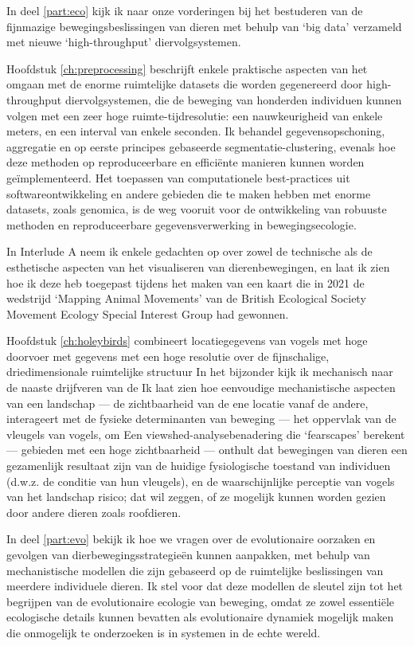 In deel \ref{part:eco} kijk ik naar onze vorderingen bij het bestuderen van de fijnmazige bewegingsbeslissingen van dieren met behulp van `big data' verzameld met nieuwe `high-throughput' diervolgsystemen.

Hoofdstuk \ref{ch:preprocessing} beschrijft enkele praktische aspecten van het omgaan met de enorme ruimtelijke datasets die worden gegenereerd door high-throughput diervolgsystemen, die de beweging van honderden individuen kunnen volgen met een zeer hoge ruimte-tijdresolutie: een nauwkeurigheid van enkele meters, en een interval van enkele seconden. Ik behandel gegevensopschoning, aggregatie en op eerste principes gebaseerde segmentatie-clustering, evenals hoe deze methoden op reproduceerbare en effici{\"e}nte manieren kunnen worden ge{\"i}mplementeerd. Het toepassen van computationele best-practices uit softwareontwikkeling en andere gebieden die te maken hebben met enorme datasets, zoals genomica, is de weg vooruit voor de ontwikkeling van robuuste methoden en reproduceerbare gegevensverwerking in bewegingsecologie.

In Interlude A neem ik enkele gedachten op over zowel de technische als de esthetische aspecten van het visualiseren van dierenbewegingen, en laat ik zien hoe ik deze heb toegepast tijdens het maken van een kaart die in 2021 de wedstrijd `Mapping Animal Movements' van de British Ecological Society Movement Ecology Special Interest Group had gewonnen.

Hoofdstuk \ref{ch:holeybirds} combineert locatiegegevens van vogels met hoge doorvoer met gegevens met een hoge resolutie over de fijnschalige, driedimensionale ruimtelijke structuur
In het bijzonder kijk ik mechanisch naar de naaste drijfveren van de
Ik laat zien hoe eenvoudige mechanistische aspecten van een landschap --- de zichtbaarheid van de ene locatie vanaf de andere, interageert met de fysieke determinanten van beweging --- het oppervlak van de vleugels van vogels, om
Een viewshed-analysebenadering die `fearscapes' berekent --- gebieden met een hoge zichtbaarheid --- onthult dat bewegingen van dieren een gezamenlijk resultaat zijn van de huidige fysiologische toestand van individuen (d.w.z. de conditie van hun vleugels), en de waarschijnlijke perceptie van vogels van het landschap risico; dat wil zeggen, of ze mogelijk kunnen worden gezien door andere dieren zoals roofdieren.

In deel \ref{part:evo} bekijk ik hoe we vragen over de evolutionaire oorzaken en gevolgen van dierbewegingsstrategie{\"e}n kunnen aanpakken, met behulp van mechanistische modellen die zijn gebaseerd op de ruimtelijke beslissingen van meerdere individuele dieren. Ik stel voor dat deze modellen de sleutel zijn tot het begrijpen van de evolutionaire ecologie van beweging, omdat ze zowel essenti{\"e}le ecologische details kunnen bevatten als evolutionaire dynamiek mogelijk maken die onmogelijk te onderzoeken is in systemen in de echte wereld.

